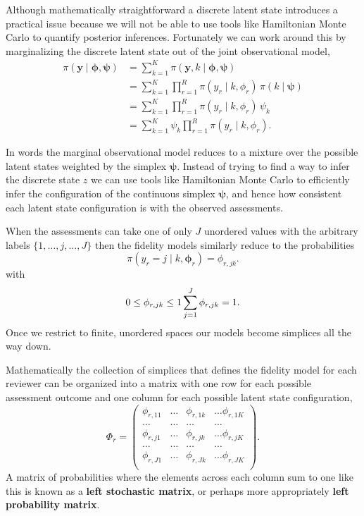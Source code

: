 \documentclass[
  letterpaper,
  DIV=11,
  numbers=noendperiod]{scrartcl}
\begin{document}
Although mathematically straightforward a discrete latent state
introduces a practical issue because we will not be able to use tools
like Hamiltonian Monte Carlo to quantify posterior inferences.
Fortunately we can work around this by marginalizing the discrete latent
state out of the joint observational model, \begin{align*}
\pi( \mathbf{y} \mid \boldsymbol{\phi}, \boldsymbol{\psi} )
&=
\sum_{k = 1}^{K} \pi( \mathbf{y}, k \mid
                      \boldsymbol{\phi}, \boldsymbol{\psi})
\\
&=
\sum_{k = 1}^{K} \prod_{r = 1}^{R} \pi( y_{r} \mid k, \phi_{r}) \,
                 \pi(k \mid \boldsymbol{\psi} )
\\
&=
\sum_{k = 1}^{K} \prod_{r = 1}^{R} \pi( y_{r} \mid k, \phi_{r}) \,
                 \psi_{k}
\\
&=
\sum_{k = 1}^{K} \psi_{k} \prod_{r = 1}^{R} \pi( y_{r} \mid k, \phi_{r}).
\end{align*}

In words the marginal observational model reduces to a mixture over the
possible latent states weighted by the simplex \(\boldsymbol{\psi}\).
Instead of trying to find a way to infer the discrete state \(z\) we can
use tools like Hamiltonian Monte Carlo to efficiently infer the
configuration of the continuous simplex \(\boldsymbol{\psi}\), and hence
how consistent each latent state configuration is with the observed
assessments.

When the assessments can take one of only \(J\) unordered values with
the arbitrary labels \(\{1, \ldots, j, \ldots, J \}\) then the fidelity
models similarly reduce to the probabilities \[
\pi( y_{r} = j \mid k, \boldsymbol{\phi}_{r}) = \phi_{r, jk}.
\] with \[
0 \le \phi_{r, jk} \le 1
\\
\sum_{j = 1}^{J} \phi_{r, jk} = 1.
\] Once we restrict to finite, unordered spaces our models become
simplices all the way down.

Mathematically the collection of simplices that defines the fidelity
model for each reviewer can be organized into a matrix with one row for
each possible assessment outcome and one column for each possible latent
state configuration, \[
\Phi_{r} =
\left( \begin{array}{ccccc}
\phi_{r, 11} & \ldots & \phi_{r, 1k} & \ldots \phi_{r, 1K} \\
\ldots       & \ldots & \ldots       & \ldots              \\
\phi_{r, j1} & \ldots & \phi_{r, jk} & \ldots \phi_{r, jK} \\
\ldots       & \ldots & \ldots       & \ldots              \\
\phi_{r, J1} & \ldots & \phi_{r, Jk} & \ldots \phi_{r, JK} \\
\end{array} \right).
\] A matrix of probabilities where the elements across each column sum
to one like this is known as a \textbf{left stochastic matrix}, or
perhaps more appropriately \textbf{left probability matrix}.
\end{document}
